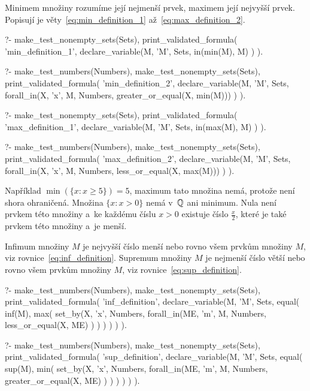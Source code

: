 Minimem množiny rozumíme její nejmenší prvek, maximem její nejvyšší prvek. Popisují je věty~\eqref{eq:min_definition_1} až~\eqref{eq:max_definition_2}.

\begin{fact}
\begin{prolog}
?-	make_test_nonempty_sets(Sets),
	print_validated_formula(
		'min_definition_1',
		declare_variable(M, 'M', Sets,
			in(min(M), M)
		)
	).
\end{prolog}
\begin{prolog}
?-	make_test_numbers(Numbers),
	make_test_nonempty_sets(Sets),
	print_validated_formula(
		'min_definition_2',
		declare_variable(M, 'M', Sets,
			forall_in(X, 'x', M, Numbers, greater_or_equal(X, min(M)))
		)
	).
\end{prolog}
\begin{prolog}
?-	make_test_nonempty_sets(Sets),
	print_validated_formula(
		'max_definition_1',
		declare_variable(M, 'M', Sets,
			in(max(M), M)
		)
	).
\end{prolog}
\begin{prolog}
?-	make_test_numbers(Numbers),
	make_test_nonempty_sets(Sets),
	print_validated_formula(
		'max_definition_2',
		declare_variable(M, 'M', Sets,
			forall_in(X, 'x', M, Numbers, less_or_equal(X, max(M)))
		)
	).
\end{prolog}
\end{fact}

Například \(\min(\{x: x \geq 5\}) = 5\), maximum tato množina nemá, protože není shora ohraničená. Množina \(\{x: x > 0\}\) nemá v~\(\mathbb{Q}\) ani minimum. Nula není prvkem této množiny a~ke každému číslu \(x > 0\) existuje číslo \(\frac{x}{2}\), které je také prvkem této množiny a~je menší.

Infimum množiny \(M\) je nejvyšší číslo menší nebo rovno všem prvkům množiny \(M\), viz rovnice~\eqref{eq:inf_definition}. Supremum množiny \(M\) je nejmenší číslo větší nebo rovno všem prvkům množiny \(M\), viz rovnice~\eqref{eq:sup_definition}. 

\begin{fact}
\begin{prolog}
?-	make_test_numbers(Numbers),
	make_test_nonempty_sets(Sets),
	print_validated_formula(
		'inf_definition',
		declare_variable(M, 'M', Sets,
			equal(
				inf(M),
				max(
					set_by(X, 'x', Numbers, 
						forall_in(ME, 'm', M, Numbers,
							less_or_equal(X, ME)
						)
					)
				)
			)
		)
	).
\end{prolog}
\begin{prolog}
?-	make_test_numbers(Numbers),
	make_test_nonempty_sets(Sets),
	print_validated_formula(
		'sup_definition',
		declare_variable(M, 'M', Sets,
			equal(
				sup(M),
				min(
					set_by(X, 'x', Numbers, 
						forall_in(ME, 'm', M, Numbers,
							greater_or_equal(X, ME)
						)
					)
				)
			)
		)
	).
\end{prolog}
\end{fact}

